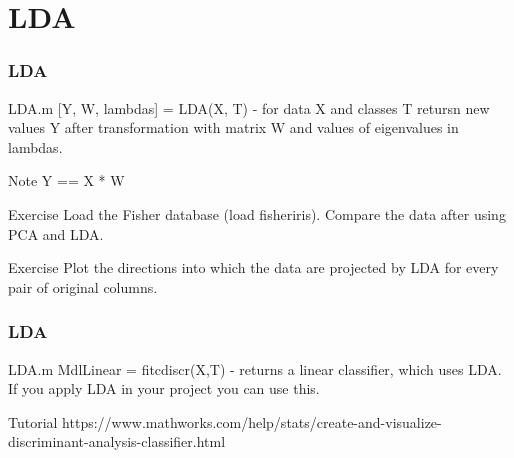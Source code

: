 \documentclass{beamer}
\begin{document}
\section{LDA}
\begin{frame}
\frametitle{LDA}

\begin{block}{LDA.m}
[Y, W, lambdas] = LDA(X, T) - for data X and classes T retursn new values Y after transformation with matrix W and values of eigenvalues in lambdas.
\end{block}

\begin{block}{Note}
Y == X * W
\end{block}

\begin{block}{Exercise}
Load the Fisher database (load fisheriris). Compare the data after using PCA and LDA.
\end{block}

\begin{block}{Exercise}
Plot the directions into which the data are projected by LDA for every pair of original columns.
\end{block}
\end{frame}


\begin{frame}
\frametitle{LDA}

\begin{block}{LDA.m}
MdlLinear = fitcdiscr(X,T) - returns a linear classifier, which uses LDA. If you apply LDA in your project you can use this.
\end{block}

\begin{block}{Tutorial}
https://www.mathworks.com/help/stats/create-and-visualize-discriminant-analysis-classifier.html
\end{block}
\end{frame}
\end{document}
